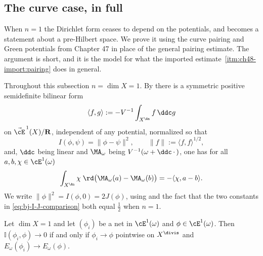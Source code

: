 \subsection{The curve case, in full}
\label{sec:ch48-curve-case}

When $n=1$ the Dirichlet form ceases to depend on the potentials, and
 becomes a statement about a
pre-Hilbert space. We prove it using the curve pairing and Green
potentials from Chapter 47 in place of the general pairing estimate. The
argument is short, and it is the model for what the imported estimate
\,\cref{itm:ch48-import:pairing} does in general.

Throughout this subsection $n=\dim X=1$.  By
 there is a symmetric positive semidefinite
bilinear form
\[
 \langle f,g\rangle:=-V^{-1}\int_{X^{\An}}f\,\ddc g
\]
on $\vec\cE^{\,1}(X)/\mathbf R$, independent of any potential, normalized so
that
\[
 I(\phi,\psi)=\lVert\phi-\psi\rVert^2,
 \qquad
 \lVert f\rVert:=\langle f,f\rangle^{1/2},
\]
and, $\ddc$ being linear and $\MA_\omega$ being
$V^{-1}(\omega+\ddc\,\cdot\,)$, one has for all
$a,b,\chi\in\cE^1(\omega)$
\[
 \int_{X^{\An}}\chi\;\rd\bigl(\MA_\omega(a)-\MA_\omega(b)\bigr)
 =-\langle\chi,a-b\rangle .
\]
We write $\lVert\phi\rVert^2=I(\phi,0)=2J(\phi)$, using
 and the fact that the two constants in
\eqref{eq:bj-I-J-comparison} both equal $\tfrac12$ when $n=1$.

\begin{proposition}
\label{prop:ch48-curve-strong}
Let $\dim X=1$ and let $(\phi_i)$ be a net in $\cE^1(\omega)$ and
$\phi\in\cE^1(\omega)$.  Then $\mathbb I(\phi_i,\phi)\to0$ if and only
if $\phi_i\to\phi$ pointwise on $X^{\divis}$ and
$E_\omega(\phi_i)\to E_\omega(\phi)$.
\end{proposition}

